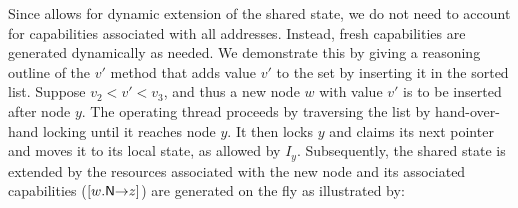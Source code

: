 Since \colosl allows for {dynamic} extension of the shared state, we do not need to account for capabilities associated with all addresses. Instead, fresh capabilities are generated dynamically as needed. We demonstrate this by giving a reasoning outline of the $v'$\li{)} method that adds value $v'$ to the set by inserting it in the sorted list.
Suppose $v_2 < v' < v_3$, and thus a new node $w$ with value $v'$ is
to be inserted after node $y$.  The operating thread proceeds by
traversing the list by hand-over-hand locking until it reaches node
$y$. It then locks $y$ and claims its next pointer and moves it to its
local state, as allowed by $I_y$. Subsequently, the shared state is
{extended} by the resources associated with the new node and its
associated capabilities ($[\nextC{w}{z}]$) are generated on the fly as
illustrated by:\vspace{0pt}

